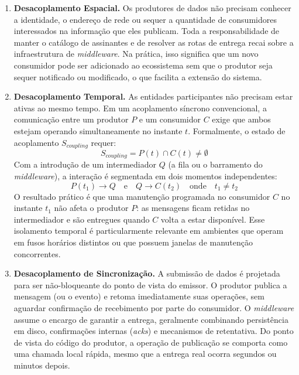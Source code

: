 \documentclass[12pt, a4paper]{article}
\begin{document}
\begin{enumerate}
    \item \textbf{Desacoplamento Espacial.} Os produtores de dados não precisam conhecer a identidade, o endereço de rede ou sequer a quantidade de consumidores interessados na informação que eles publicam. Toda a responsabilidade de manter o catálogo de assinantes e de resolver as rotas de entrega recai sobre a infraestrutura de \textit{middleware}. Na prática, isso significa que um novo consumidor pode ser adicionado ao ecossistema sem que o produtor seja sequer notificado ou modificado, o que facilita a extensão do sistema.

    \item \textbf{Desacoplamento Temporal.} As entidades participantes não precisam estar ativas ao mesmo tempo. Em um acoplamento síncrono convencional, a comunicação entre um produtor $P$ e um consumidor $C$ exige que ambos estejam operando simultaneamente no instante $t$. Formalmente, o estado de acoplamento $S_{coupling}$ requer:
    \begin{equation}
        S_{coupling} = P(t) \cap C(t) \neq \emptyset
    \end{equation}
    Com a introdução de um intermediador $Q$ (a fila ou o barramento do \textit{middleware}), a interação é segmentada em dois momentos independentes:
    \begin{equation}
        P(t_1) \rightarrow Q \quad \text{e} \quad Q \rightarrow C(t_2) \quad \text{onde} \quad t_1 \neq t_2
    \end{equation}
    O resultado prático é que uma manutenção programada no consumidor $C$ no instante $t_1$ não afeta o produtor $P$: as mensagens ficam retidas no intermediador e são entregues quando $C$ volta a estar disponível. Esse isolamento temporal é particularmente relevante em ambientes que operam em fusos horários distintos ou que possuem janelas de manutenção concorrentes.

    \item \textbf{Desacoplamento de Sincronização.} A submissão de dados é projetada para ser não-bloqueante do ponto de vista do emissor. O produtor publica a mensagem (ou o evento) e retoma imediatamente suas operações, sem aguardar confirmação de recebimento por parte do consumidor. O \textit{middleware} assume o encargo de garantir a entrega, geralmente combinando persistência em disco, confirmações internas (\textit{acks}) e mecanismos de retentativa. Do ponto de vista do código do produtor, a operação de publicação se comporta como uma chamada local rápida, mesmo que a entrega real ocorra segundos ou minutos depois.
\end{enumerate}
\end{document}
